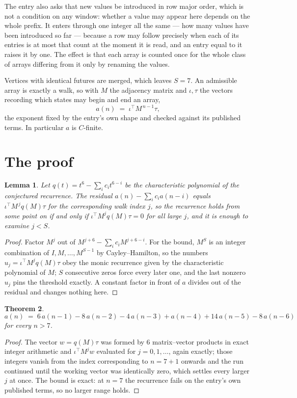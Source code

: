 \documentclass[11pt,a4paper]{article}
\theoremstyle{plain}
\newtheorem{theorem}{Theorem}
\newtheorem{lemma}[theorem]{Lemma}
\theoremstyle{definition}
\begin{document}
The entry also asks that new values be introduced in row major order, which is not a condition on any window: whether a value may appear here depends on the whole prefix. It enters through one integer all the same --- how many values have been introduced so far --- because a row may follow precisely when each of its entries is at most that count at the moment it is read, and an entry equal to it raises it by one. The effect is that each array is counted once for the whole class of arrays differing from it only by renaming the values.

Vertices with identical futures are merged, which leaves $S=7$. An admissible array is exactly a walk, so with $M$ the adjacency matrix and $\iota,\tau$ the vectors recording which states may begin and end an array,
\[
a(n)\;=\;\iota^{\!\top}M^{\,n-1}\tau ,
\]
the exponent fixed by the entry's own shape and checked against its published terms. In
particular $a$ is $C$-finite.

\section{The proof}

\begin{lemma}\label{lem:crit}
Let $q(t)=t^{6}-\sum_i c_it^{6-i}$ be the characteristic polynomial of the
conjectured recurrence. The residual $a(n)-\sum_ic_ia(n-i)$ equals
$\iota^{\!\top}M^{\,j}q(M)\tau$ for the corresponding walk index $j$, so the recurrence
holds from some point on if and only if $\iota^{\!\top}M^{j}q(M)\tau=0$ for all large $j$,
and it is enough to examine $j<S$.
\end{lemma}

\begin{proof}
Factor $M^{j}$ out of $M^{j+6}-\sum_ic_iM^{j+6-i}$. For the bound, $M^{S}$
is an integer combination of $I,M,\dots,M^{S-1}$ by Cayley--Hamilton, so the numbers
$u_j=\iota^{\!\top}M^{j}q(M)\tau$ obey the monic recurrence given by the characteristic
polynomial of $M$; $S$ consecutive zeros force every later one, and the last nonzero $u_j$
pins the threshold exactly. A constant factor in front of $a$ divides out of the residual and
changes nothing here.
\end{proof}

\begin{theorem}
\[
a(n)\;=\;6\,a(n-1) - 8\,a(n-2) - 4\,a(n-3) + a(n-4) + 14\,a(n-5) - 8\,a(n-6)
\]
for every $n>7$.
\end{theorem}

\begin{proof}
The vector $w=q(M)\tau$ was formed by $6$ matrix--vector products in exact integer
arithmetic and $\iota^{\!\top}M^{j}w$ evaluated for $j=0,1,\dots$, again exactly; those
integers vanish from the index corresponding to $n=7+1$ onwards and the run continued
until the working vector was identically zero, which settles every larger $j$ at once. The bound is exact: at $n=7$ the recurrence fails on the entry's own published terms, so no larger range holds.
\end{proof}
\end{document}
